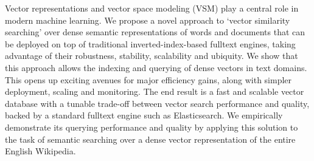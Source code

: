 Vector representations and vector space modeling (VSM) play a central role in modern machine learning. We propose a novel approach to ‘vector similarity searching' over dense semantic representations of words and documents that can be deployed on top of traditional inverted-index-based fulltext engines, taking advantage of their robustness, stability, scalability and ubiquity. We show that this approach allows the indexing and querying of dense vectors in text domains. This opens up exciting avenues for major efficiency gains, along with simpler deployment, scaling and monitoring. The end result is a fast and scalable vector database with a tunable trade-off between vector search performance and quality, backed by a standard fulltext engine such as Elasticsearch. We empirically demonstrate its querying performance and quality by applying this solution to the task of semantic searching over a dense vector representation of the entire English Wikipedia.
